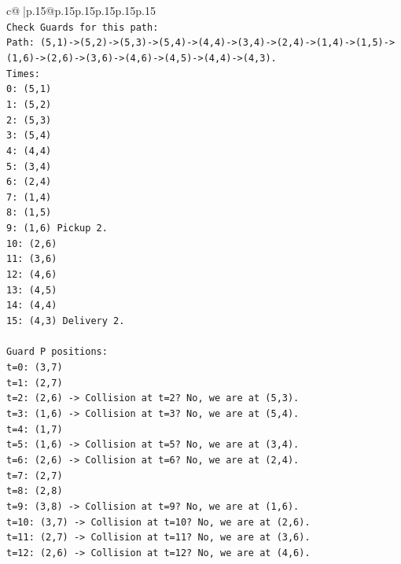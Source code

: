 \documentclass{article}
\begin{document}
{\begin{supertabular}{c@{$\;$}|p{.15\linewidth}@{}p{.15\linewidth}p{.15\linewidth}p{.15\linewidth}p{.15\linewidth}p{.15\linewidth}}
{{{\\ 
\texttt{Check Guards for this path:} \\
\texttt{Path: (5,1){-}>(5,2){-}>(5,3){-}>(5,4){-}>(4,4){-}>(3,4){-}>(2,4){-}>(1,4){-}>(1,5){-}>(1,6){-}>(2,6){-}>(3,6){-}>(4,6){-}>(4,5){-}>(4,4){-}>(4,3).} \\
\texttt{Times:} \\
\texttt{0: (5,1)} \\
\texttt{1: (5,2)} \\
\texttt{2: (5,3)} \\
\texttt{3: (5,4)} \\
\texttt{4: (4,4)} \\
\texttt{5: (3,4)} \\
\texttt{6: (2,4)} \\
\texttt{7: (1,4)} \\
\texttt{8: (1,5)} \\
\texttt{9: (1,6) Pickup 2.} \\
\texttt{10: (2,6)} \\
\texttt{11: (3,6)} \\
\texttt{12: (4,6)} \\
\texttt{13: (4,5)} \\
\texttt{14: (4,4)} \\
\texttt{15: (4,3) Delivery 2.} \\
\\ 
\texttt{Guard P positions:} \\
\texttt{t=0: (3,7)} \\
\texttt{t=1: (2,7)} \\
\texttt{t=2: (2,6) {-}> Collision at t=2? No, we are at (5,3).} \\
\texttt{t=3: (1,6) {-}> Collision at t=3? No, we are at (5,4).} \\
\texttt{t=4: (1,7)} \\
\texttt{t=5: (1,6) {-}> Collision at t=5? No, we are at (3,4).} \\
\texttt{t=6: (2,6) {-}> Collision at t=6? No, we are at (2,4).} \\
\texttt{t=7: (2,7)} \\
\texttt{t=8: (2,8)} \\
\texttt{t=9: (3,8) {-}> Collision at t=9? No, we are at (1,6).} \\
\texttt{t=10: (3,7) {-}> Collision at t=10? No, we are at (2,6).} \\
\texttt{t=11: (2,7) {-}> Collision at t=11? No, we are at (3,6).} \\
\texttt{t=12: (2,6) {-}> Collision at t=12? No, we are at (4,6).} \\
}}}
\end{supertabular}}
\end{document}
